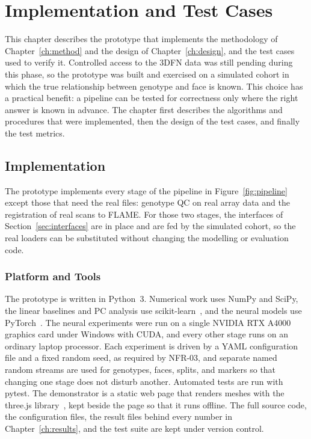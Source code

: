 \chapter{Implementation and Test Cases}
\label{ch:impl}
This chapter describes the prototype that implements the methodology of Chapter~\ref{ch:method} and the design of Chapter~\ref{ch:design}, and the test cases used to verify it. Controlled access to the 3DFN data was still pending during this phase, so the prototype was built and exercised on a simulated cohort in which the true relationship between genotype and face is known. This choice has a practical benefit: a pipeline can be tested for correctness only where the right answer is known in advance. The chapter first describes the algorithms and procedures that were implemented, then the design of the test cases, and finally the test metrics.

\section{Implementation}
The prototype implements every stage of the pipeline in Figure~\ref{fig:pipeline} except those that need the real files: genotype QC on real array data and the registration of real scans to FLAME. For those two stages, the interfaces of Section~\ref{sec:interfaces} are in place and are fed by the simulated cohort, so the real loaders can be substituted without changing the modelling or evaluation code.

\subsection{Platform and Tools}
The prototype is written in Python~3. Numerical work uses NumPy and SciPy, the linear baselines and PC analysis use scikit-learn~\cite{ref:sklearn}, and the neural models use PyTorch~\cite{ref:pytorch}. The neural experiments were run on a single NVIDIA RTX A4000 graphics card under Windows with CUDA, and every other stage runs on an ordinary laptop processor. Each experiment is driven by a YAML configuration file and a fixed random seed, as required by NFR-03, and separate named random streams are used for genotypes, faces, splits, and markers so that changing one stage does not disturb another. Automated tests are run with pytest. The demonstrator is a static web page that renders meshes with the three.js library~\cite{ref:threejs}, kept beside the page so that it runs offline. The full source code, the configuration files, the result files behind every number in Chapter~\ref{ch:results}, and the test suite are kept under version control.


